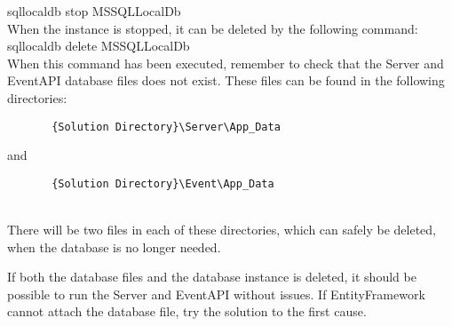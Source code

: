 \indent	sqllocaldb stop MSSQLLocalDb\\

When the instance is stopped, it can be deleted by the following command:\\

\indent	sqllocaldb delete MSSQLLocalDb\\

When this command has been executed, remember to check that the Server and EventAPI database files does not exist. These files can be found in the following directories:\\

\begin{verbatim}	   {Solution Directory}\Server\App_Data    \end{verbatim} and
\begin{verbatim}	   {Solution Directory}\Event\App_Data\end{verbatim} \\

There will be two files in each of these directories, which can safely be deleted, when the database is no longer needed.

If both the database files and the database instance is deleted, it should be possible to run the Server and EventAPI without issues. If EntityFramework cannot attach the database file, try the solution to the first cause.

